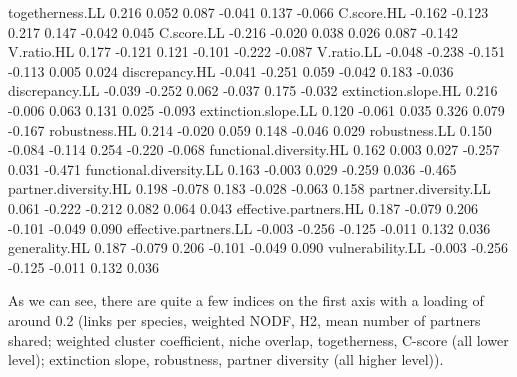 \documentclass[a4paper, 11pt]{article}
\begin{document}
\begin{Schunk}
\begin{Soutput}
togetherness.LL                       0.216  0.052  0.087 -0.041  0.137 -0.066
C.score.HL                           -0.162 -0.123  0.217  0.147 -0.042  0.045
C.score.LL                           -0.216 -0.020  0.038  0.026  0.087 -0.142
V.ratio.HL                            0.177 -0.121  0.121 -0.101 -0.222 -0.087
V.ratio.LL                           -0.048 -0.238 -0.151 -0.113  0.005  0.024
discrepancy.HL                       -0.041 -0.251  0.059 -0.042  0.183 -0.036
discrepancy.LL                       -0.039 -0.252  0.062 -0.037  0.175 -0.032
extinction.slope.HL                   0.216 -0.006  0.063  0.131  0.025 -0.093
extinction.slope.LL                   0.120 -0.061  0.035  0.326  0.079 -0.167
robustness.HL                         0.214 -0.020  0.059  0.148 -0.046  0.029
robustness.LL                         0.150 -0.084 -0.114  0.254 -0.220 -0.068
functional.diversity.HL               0.162  0.003  0.027 -0.257  0.031 -0.471
functional.diversity.LL               0.163 -0.003  0.029 -0.259  0.036 -0.465
partner.diversity.HL                  0.198 -0.078  0.183 -0.028 -0.063  0.158
partner.diversity.LL                  0.061 -0.222 -0.212  0.082  0.064  0.043
effective.partners.HL                 0.187 -0.079  0.206 -0.101 -0.049  0.090
effective.partners.LL                -0.003 -0.256 -0.125 -0.011  0.132  0.036
generality.HL                         0.187 -0.079  0.206 -0.101 -0.049  0.090
vulnerability.LL                     -0.003 -0.256 -0.125 -0.011  0.132  0.036
\end{Soutput}
\end{Schunk}
As we can see, there are quite a few indices on the first axis with a loading of around 0.2 (links per species, weighted NODF, H2, mean number of partners shared; weighted cluster coefficient, niche overlap, togetherness, C-score (all lower level); extinction slope, robustness, partner diversity (all higher level)). 
\end{document}
